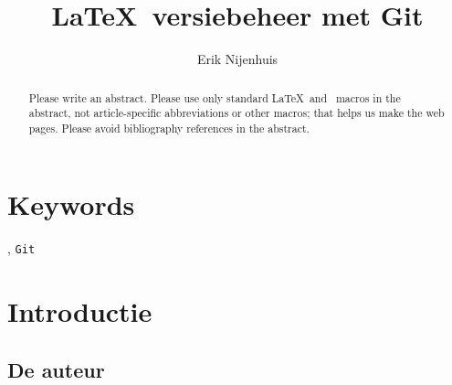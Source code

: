 \documentclass[dutch]{ltugboat}
\title{\LaTeX\ versiebeheer met Git}
\author{Erik Nijenhuis}
\begin{document}
    \maketitle

    \begin{abstract}
        Please write an abstract. Please use only standard \LaTeX\ and \TUB\
        macros in the abstract, not article-specific abbreviations or other
        macros; that helps us make the web pages. Please avoid bibliography
        references in the abstract.
    \end{abstract}

    \section*{Keywords}
    \LuaLaTeX, \texttt{Git}

    \section{Introductie}

    \subsection{De auteur}


    
    \nocite{book-minimal}      %

    \makesignature
\end{document}
